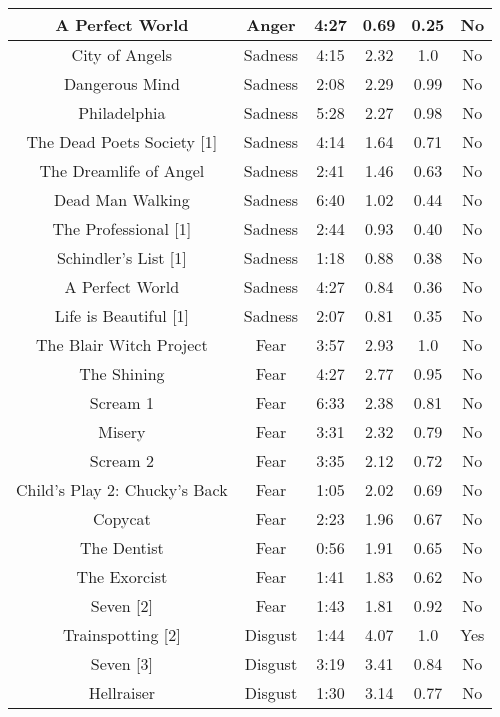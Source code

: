 \begin{table}[]
\begin{tabular}{|c|c|c|c|c|c|}
         A Perfect World & Anger & 4:27 & 0.69 & 0.25  & No \\ \hline
         City of Angels & Sadness & 4:15 & 2.32 &1.0  & No \\ \hline
         Dangerous Mind & Sadness & 2:08 & 2.29 &0.99 & No \\ \hline
         Philadelphia & Sadness & 5:28 & 2.27  &0.98  & No \\ \hline
         The Dead Poets Society [1] & Sadness & 4:14 & 1.64 &0.71  & No \\ \hline
         The Dreamlife of Angel & Sadness & 2:41 & 1.46 &0.63  & No \\ \hline
         Dead Man Walking & Sadness & 6:40 & 1.02 &0.44 & No \\ \hline
         The Professional [1] & Sadness & 2:44 & 0.93 & 0.40 & No \\ \hline
         Schindler’s List [1] & Sadness & 1:18 & 0.88 &0.38  & No \\ \hline
         A Perfect World & Sadness & 4:27 & 0.84 &0.36  & No \\ \hline
         Life is Beautiful [1] & Sadness & 2:07 & 0.81 & 0.35   & No \\ \hline
          The Blair Witch Project & Fear & 3:57 & 2.93 &1.0   & No \\ \hline
          The Shining & Fear & 4:27 & 2.77 &0.95  & No \\ \hline
          Scream 1 & Fear & 6:33 & 2.38 &0.81  & No \\ \hline
          Misery & Fear & 3:31 & 2.32 &0.79  & No \\ \hline
          Scream 2 & Fear & 3:35 & 2.12 &0.72  & No \\ \hline
          Child’s Play 2: Chucky’s Back & Fear & 1:05 & 2.02 &0.69  & No \\ \hline
          Copycat & Fear & 2:23 & 1.96 &0.67  & No \\ \hline
          The Dentist & Fear & 0:56 & 1.91  &0.65 & No \\ \hline
          The Exorcist & Fear & 1:41 & 1.83 &0.62  & No \\ \hline
          Seven [2] & Fear & 1:43 & 1.81  &0.92 & No \\ \hline
          Trainspotting [2] & Disgust & 1:44 & 4.07  &1.0 & Yes \\ \hline
          Seven [3] & Disgust & 3:19 & 3.41 &0.84  & No \\ \hline
          Hellraiser & Disgust & 1:30 & 3.14 &0.77  & No \\ \hline

\end{tabular}
\end{table}
